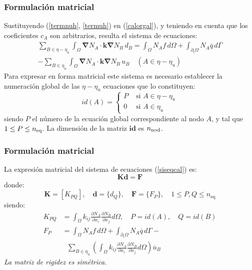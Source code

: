 \documentclass[handout]{beamer}
\begin{document}
\begin{frame}
\frametitle{Formulación matricial}

Sustituyendo (\ref{termnuh}, \ref{termuh}) en (\ref{calorgal}), y teniendo
en cuenta que los coeficientes $c_A$ son arbitrarios, resulta el 
sistema de ecuaciones:
\begin{multline}
\sum_{B \in \eta-\eta_u} \int_{\Omega} \bm{\nabla} N_A \cdot \bm{k} \bm{\nabla} N_B \, d_B=
\int_{\Omega} N_A f \, d\Omega+
\int_{\partial_t \Omega} N_A \overline{q} \, d\Gamma \\
- \sum_{B \in \eta_u} \int_{\Omega} \bm{\nabla} N_A \cdot \bm{k} \bm{\nabla} N_B \, u_B
\quad (A \in \eta-\eta_u) \label{siseqcal}
\end{multline}
Para expresar en forma matricial este sistema
es necesario establecer la numeración global de las $\eta-\eta_u$ ecuaciones
que lo constituyen:
\begin{equation}
id(A)=\left\{
\begin{array}{ll}
P & \textrm{ si } A \in \eta-\eta_u \\
0 & \textrm{ si } A \in \eta_u
\end{array}
\right. \label{idmcalor}
\end{equation}
siendo $P$ el número de la ecuación global correspondiente al nodo $A$, y tal
que $1 \leq P \leq n_{\rm eq}$. La dimensión de la matriz $\bm{id}$ es $n_{\rm nod}$.
\end{frame}
\begin{frame}
\frametitle{Formulación matricial}
La expresión matricial del sistema de ecuaciones (\ref{siseqcal}) es:
\begin{equation}
\mathbf{K} \bm{d}=\bm{F}
\end{equation}
donde:
\begin{equation}
\bm{K}= [K_{PQ}]                                        ,\quad
\bm{d}= \{d_Q\}                                              ,\quad
\bm{F}= \{F_P\}                                              ,\quad
1 \leq P,Q \leq n_{\textrm{eq}}
\end{equation}
siendo:
\begin{align}
K_{PQ}&=\int_{\Omega} k_{ij} \frac{\partial N_A}{\partial x_i}
                             \frac{\partial N_B}{\partial x_j}
                             d \Omega                        ,\quad
P=id(A)                                                      ,\quad
Q=id(B)
                                                             \label{kglpoi} \\
F_P&= \int_{\Omega} N_A f \, d\Omega+
      \int_{\partial_t \Omega} N_A \overline{q} \, d\Gamma
     -                                                       \nonumber \\
   &\mbox{ } \sum_{B \in \eta_u} \left(
      \int_{\Omega} k_{ij} \frac{\partial N_A}{\partial x_i}
      \frac{\partial N_B}{\partial x_j} d \Omega
                          \right) \overline{u}_B
\end{align}
{\em La matriz de rigidez es simétrica.}
\end{frame}
\end{document}
